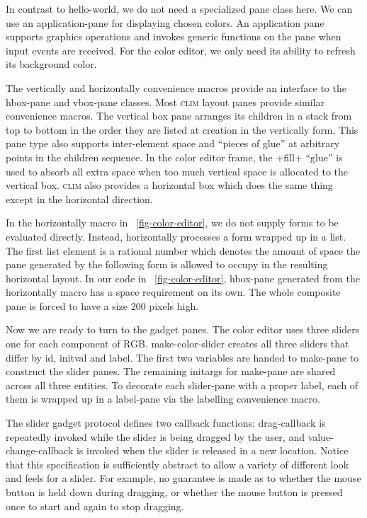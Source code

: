 \documentclass[twocolumn,a4paper]{article}
\newcommand {\code}[1]{{\sffamily #1}}
\newcommand {\CLIM}{\textsc{clim}}
\let\class\code
\let\method\code
\let\constant\code
\let\variable\code
\let\macro\code
\begin{document}
In contrast to \class{hello-world}, we do not need a specialized pane
class here. We can use an application-pane for displaying chosen
colors.  An application pane supports graphics operations and invokes
generic functions on the pane when input events are received. For the
color editor, we only need its ability to refresh its background
color.

The \macro{vertically} and \macro{horizontally} convenience macros
provide an interface to the \class{hbox-pane} and \class{vbox-pane}
classes. Most \CLIM{} layout panes provide similar convenience
macros. The vertical box pane arranges its children in a stack from
top to bottom in the order they are listed at creation in the
vertically form. This pane type also supports inter-element space and
``pieces of glue'' at arbitrary points in the children sequence. In
the color editor frame, the \constant{+fill+} ``glue'' is used to
absorb all extra space when too much vertical space is allocated to
the vertical box. \CLIM{} also provides a horizontal box which does
the same thing except in the horizontal direction.

In the \macro{horizontally} macro in
\figurename~\ref{fig-color-editor}, we do not supply forms to be
evaluated directly. Instead, \method{horizontally} processes a form
wrapped up in a list. The first list element is a rational number
which denotes the amount of space the pane generated by the following
form is allowed to occupy in the resulting horizontal layout. In our
code in \figurename~\ref{fig-color-editor}, \class{hbox-pane}
generated from the \macro{horizontally} macro has a space requirement
on its own. The whole composite pane is forced to have a size 200
pixels high.

Now we are ready to turn to the gadget panes. The color editor uses
three sliders one for each component of RGB.
\method{make-color-slider} creates all three sliders that differ by
\variable{id}, \variable{initval} and \variable{label}. The first two
variables are handed to \method{make-pane} to construct the slider
panes. The remaining initargs for \method{make-pane} are shared across
all three entities. To decorate each slider-pane with a proper label,
each of them is wrapped up in a \class{label-pane} via the
\macro{labelling} convenience macro.

The slider gadget protocol defines two callback functions:
\method{drag-callback} is repeatedly invoked while the slider is being
dragged by the user, and \method{value-change-callback} is invoked
when the slider is released in a new location. Notice that this
specification is sufficiently abstract to allow a variety of different
look and feels for a slider. For example, no guarantee is made as to
whether the mouse button is held down during dragging, or whether the
mouse button is pressed once to start and again to stop dragging.
\end{document}
